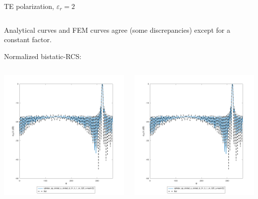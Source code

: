 \begin{frame}{TE polarization, $\varepsilon_r=2$}
\begin{columns}
\end{columns}

\vbs

Analytical curves and FEM curves agree (some discrepancies) except for a constant factor. 

Normalized bistatic-RCS:

\vbss

\begin{columns}

\includegraphics[width=\linewidth]{results/FF/cylD_01_H_1_M_025_X/epr2_TE_norm.png}


\includegraphics[width=\linewidth]{results/FF/cylD_01_H_1_M_025_Y/epr2_TE_norm.png}


\end{columns}
\end{frame}
